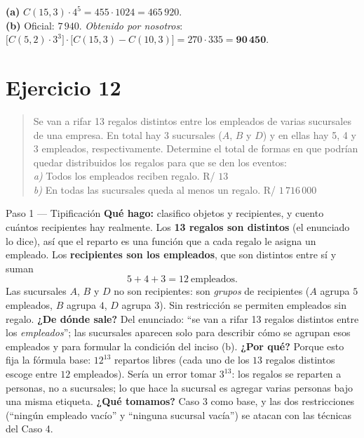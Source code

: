 \documentclass[11pt]{article}
\begin{document}
\begin{resp}
\textbf{(a)} $C(15,3)\cdot 4^5=455\cdot 1024=465\,920$.\\
\textbf{(b)} Oficial: $7\,940$. \emph{Obtenido por nosotros}: $\bigl[C(5,2)\cdot 3^3\bigr]\cdot\bigl[C(15,3)-C(10,3)\bigr]=270\cdot 335=\mathbf{90\,450}$.
\end{resp}

\section*{Ejercicio 12}

\begin{quote}
Se van a rifar 13 regalos distintos entre los empleados de varias sucursales de una empresa. En total hay 3 sucursales ($A$, $B$ y $D$) y en ellas hay 5, 4 y 3 empleados, respectivamente. Determine el total de formas en que podrían quedar distribuidos los regalos para que se den los eventos:\\
\textit{a)} Todos los empleados reciben regalo. \hfill R/ $13$\\
\textit{b)} En todas las sucursales queda al menos un regalo. \hfill R/ $1\,716\,000$
\end{quote}

\begin{paso}{Paso 1 --- Tipificación}
\textbf{Qué hago:} clasifico objetos y recipientes, y cuento cuántos recipientes hay realmente.
Los \textbf{13 regalos son distintos} (el enunciado lo dice), así que el reparto es una función que a cada regalo le asigna un empleado. Los \textbf{recipientes son los empleados}, que son distintos entre sí y suman
\[
5+4+3=12\ \text{empleados}.
\]
Las sucursales $A$, $B$ y $D$ no son recipientes: son \emph{grupos} de recipientes ($A$ agrupa $5$ empleados, $B$ agrupa $4$, $D$ agrupa $3$). Sin restricción se permiten empleados sin regalo.
\textbf{¿De dónde sale?} Del enunciado: ``se van a rifar 13 regalos distintos entre los \emph{empleados}''; las sucursales aparecen solo para describir cómo se agrupan esos empleados y para formular la condición del inciso (b).
\textbf{¿Por qué?} Porque esto fija la fórmula base: $12^{13}$ repartos libres (cada uno de los $13$ regalos distintos escoge entre $12$ empleados). Sería un error tomar $3^{13}$: los regalos se reparten a personas, no a sucursales; lo que hace la sucursal es agregar varias personas bajo una misma etiqueta.
\textbf{¿Qué tomamos?} Caso 3 como base, y las dos restricciones (``ningún empleado vacío'' y ``ninguna sucursal vacía'') se atacan con las técnicas del Caso 4.
\end{paso}
\end{document}
